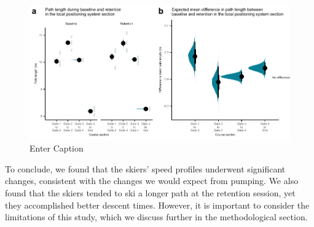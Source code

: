 \begin{figure}
    \centering
    \includegraphics[width=1\linewidth]{figure/figure_path5.pdf}
    \caption{Enter Caption}
    \label{fig:lps_path}
\end{figure}




To conclude, we found that the skiers' speed profiles underwent significant changes, consistent with the changes we would expect from pumping. We also found that the skiers tended to ski a longer path at the retention session, yet they accomplished better descent times. However, it is important to consider the limitations of this study, which we discuss further in the methodological section. 

